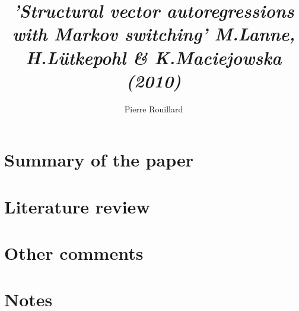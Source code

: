 \documentclass[letterpaper,12pt,leqno]{article}
\begin{document}
\title{\textit{'Structural vector autoregressions with Markov switching' M.Lanne, H.Lütkepohl \& K.Maciejowska (2010)}}
\author{Pierre Rouillard}
\date{}

\begin{titlepage}
\maketitle
\tableofcontents
\end{titlepage}

\section{Summary of the paper}\label{sec:sec1}


\section{Literature review}\label{sec:sec2}


\section{Other comments}\label{sec:sec3}


\newpage
\section{Notes}\label{sec:appendix}


\newpage


\end{document}
